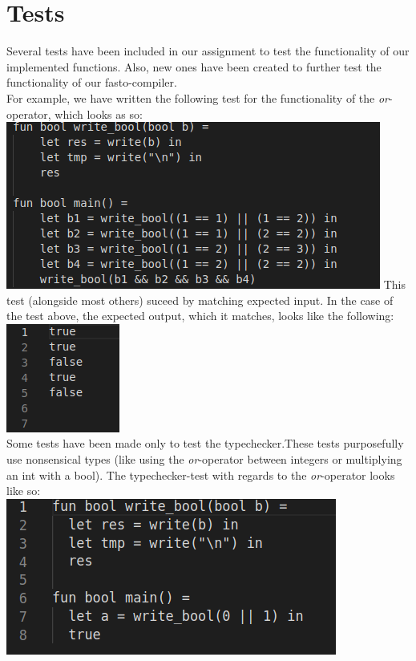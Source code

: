 \section{Tests}
Several tests have been included in our assignment to test the functionality of our implemented functions. Also, new ones have been created to further test the functionality of our fasto-compiler.\\
For example, we have written the following test for the functionality of the \textit{or}-operator, which looks as so:\\
\includegraphics[width=\linewidth]{Materials/Tests/OrTest}
This test (alongside most others) suceed by matching expected input. In the case of the test above, the expected output, which it matches, looks like the following:\\
\includegraphics[width=0.4\linewidth]{Materials/Tests/OrExpected}\\
Some tests have been made only to test the typechecker.These tests purposefully use nonsensical types (like using the \textit{or}-operator between integers or multiplying an int with a bool). The typechecker-test with regards to the \textit{or}-operator looks like so:\\
\includegraphics[width=\linewidth]{Materials/Tests/OrTypeCheck}\\
